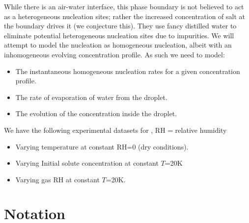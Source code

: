 \documentclass[11pt,twoside]{report}
\begin{document}
While there is an air-water interface, this phase boundary is not believed to act as a heterogeneous nucleation sites; rather the increased concentration of salt at the boundary drives it (we conjecture this).
They use fancy distilled water to eliminate potential heterogeneous nucleation sites due to impurities.
We will attempt to model the nucleation as homogeneous nucleation, albeit with an inhomogeneous evolving concentration profile.
As such we need to model:
\begin{itemize}
  \item The instantaneous homogeneous nucleation rates for a given concentration profile.
  \item The rate of evaporation of water from the droplet.
  \item The evolution of the concentration inside the droplet.
\end{itemize}

We have the following experimental datasets for , RH = relative humidity
\begin{itemize}
\item Varying temperature at constant RH=0 (dry conditions).
\item Varying Initial solute concentration at constant $T$=20\si{K}
\item Varying gas RH at constant $T$=20\si{K}.
\end{itemize}

\section{Notation}
\end{document}
